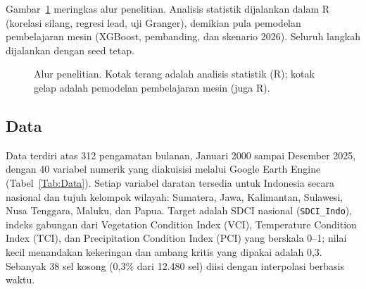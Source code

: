 \documentclass[11pt,twoside]{article}
\begin{document}
Gambar~\ref{Fig:Pipeline} meringkas alur penelitian. Analisis statistik dijalankan dalam R (korelasi silang, regresi lead, uji Granger), demikian pula pemodelan pembelajaran mesin (XGBoost, pembanding, dan skenario 2026). Seluruh langkah dijalankan dengan seed tetap.

\begin{figure}[ht]
\centering
{}
\caption{Alur penelitian. Kotak terang adalah analisis statistik (R); kotak gelap adalah pemodelan pembelajaran mesin (juga R).}
\label{Fig:Pipeline}
\end{figure}

\subsection{Data}
\label{SubSec:Data}

Data terdiri atas 312 pengamatan bulanan, Januari 2000 sampai Desember 2025, dengan 40 variabel numerik yang diakuisisi melalui Google Earth Engine (Tabel~\ref{Tab:Data}). Setiap variabel daratan tersedia untuk Indonesia secara nasional dan tujuh kelompok wilayah: Sumatera, Jawa, Kalimantan, Sulawesi, Nusa Tenggara, Maluku, dan Papua. Target adalah SDCI nasional (\texttt{SDCI\_Indo}), indeks gabungan dari Vegetation Condition Index (VCI), Temperature Condition Index (TCI), dan Precipitation Condition Index (PCI) yang berskala 0--1; nilai kecil menandakan kekeringan dan ambang kritis yang dipakai adalah 0,3. Sebanyak 38 sel kosong (0,3\% dari 12.480 sel) diisi dengan interpolasi berbasis waktu.
\end{document}
